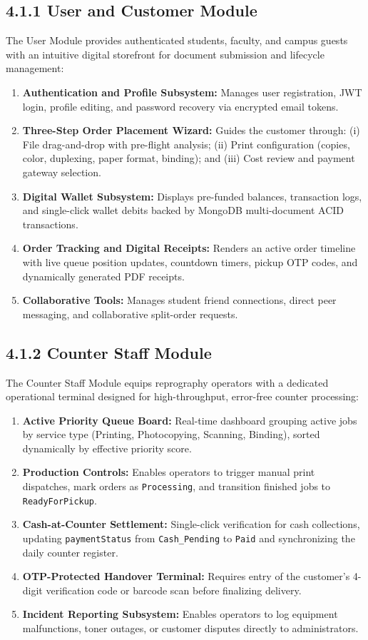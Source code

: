 \documentclass[12pt,a4paper,oneside]{report}
\begin{document}
\subsection{4.1.1 User and Customer Module}
The User Module provides authenticated students, faculty, and campus guests with an intuitive digital storefront for document submission and lifecycle management:
\begin{enumerate}[leftmargin=0.35in, itemsep=2pt]
  \item \textbf{Authentication and Profile Subsystem:} Manages user registration, JWT login, profile editing, and password recovery via encrypted email tokens.
  \item \textbf{Three-Step Order Placement Wizard:} Guides the customer through: (i) File drag-and-drop with pre-flight analysis; (ii) Print configuration (copies, color, duplexing, paper format, binding); and (iii) Cost review and payment gateway selection.
  \item \textbf{Digital Wallet Subsystem:} Displays pre-funded balances, transaction logs, and single-click wallet debits backed by MongoDB multi-document ACID transactions.
  \item \textbf{Order Tracking and Digital Receipts:} Renders an active order timeline with live queue position updates, countdown timers, pickup OTP codes, and dynamically generated PDF receipts.
  \item \textbf{Collaborative Tools:} Manages student friend connections, direct peer messaging, and collaborative split-order requests.
\end{enumerate}

\subsection{4.1.2 Counter Staff Module}
The Counter Staff Module equips reprography operators with a dedicated operational terminal designed for high-throughput, error-free counter processing:
\begin{enumerate}[leftmargin=0.35in, itemsep=2pt]
  \item \textbf{Active Priority Queue Board:} Real-time dashboard grouping active jobs by service type (Printing, Photocopying, Scanning, Binding), sorted dynamically by effective priority score.
  \item \textbf{Production Controls:} Enables operators to trigger manual print dispatches, mark orders as \texttt{Processing}, and transition finished jobs to \texttt{ReadyForPickup}.
  \item \textbf{Cash-at-Counter Settlement:} Single-click verification for cash collections, updating \texttt{paymentStatus} from \texttt{Cash\_Pending} to \texttt{Paid} and synchronizing the daily counter register.
  \item \textbf{OTP-Protected Handover Terminal:} Requires entry of the customer's 4-digit verification code or barcode scan before finalizing delivery.
  \item \textbf{Incident Reporting Subsystem:} Enables operators to log equipment malfunctions, toner outages, or customer disputes directly to administrators.
\end{enumerate}
\end{document}
